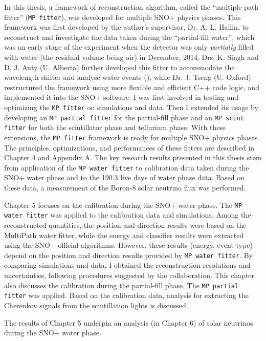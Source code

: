 In this thesis, a framework of reconstruction algorithm, called the ``multiple-path fitter'' (\texttt{MP fitter}), was developed for multiple SNO+ physics phases. This framework was first developed by the author's supervisor, Dr. A. L. Hallin, to reconstruct and investigate the data taken during the ``partial-fill water'', which was an early stage of the experiment when the detector was only {\em partially} filled with water (the residual volume being air) in December, 2014\cite{partialWater}. Drs. K. Singh and D. J. Auty (U. Alberta) further developed this fitter to accommodate the wavelength shifter and analyse water events (\cite{davidPartialWater, kalpanaWLS, kalpanaWLS2, kalpanaMPFitter}), while Dr. J. Tseng (U. Oxford) restructured the framework using more flexible and efficient C++ code logic, and implemented it into the SNO+ software\cite{jieMPW}. I was first involved in testing and optimizing the \texttt{MP fitter} on simulations and data. Then I extended its usage by developing an \texttt{MP partial fitter} for the partial-fill phase and an \texttt{MP scint fitter} for both the scintillator phase and tellurium phase. With these extensions, the \texttt{MP fitter} framework is ready for multiple SNO+ physics phases. The principles, optimizations, and performances of these fitters are described in Chapter 4 and Appendix A. The key research results presented in this thesis stem from application of the \texttt{MP water fitter} to calibration data taken during the SNO+ water phase and to the 190.3 live days of water phase data. Based on these data, a measurement of the Boron-8 solar neutrino flux was performed.

Chapter 5 focuses on the calibration during the SNO+ water phase. The \texttt{MP water fitter} was applied to the calibration data and simulations. Among the reconstructed quantities, the position and direction results were based on the MultiPath water fitter, while the energy and classifier results were extracted using the SNO+ official algorithms. However, these results (energy, event type) depend on the position and direction results provided by \texttt{MP water fitter}. By comparing simulations and data, I obtained the reconstruction resolutions and uncertainties, following procedures suggested by the collaboration. This chapter also discusses the calibration during the partial-fill phase. The \texttt{MP partial fitter} was applied. Based on the calibration data, analysis for extracting the Cherenkov signals from the scintillation lights is discussed.

The results of Chapter 5 underpin an analysis (in Chapter 6) of solar neutrinos during the SNO+ water phase. 

